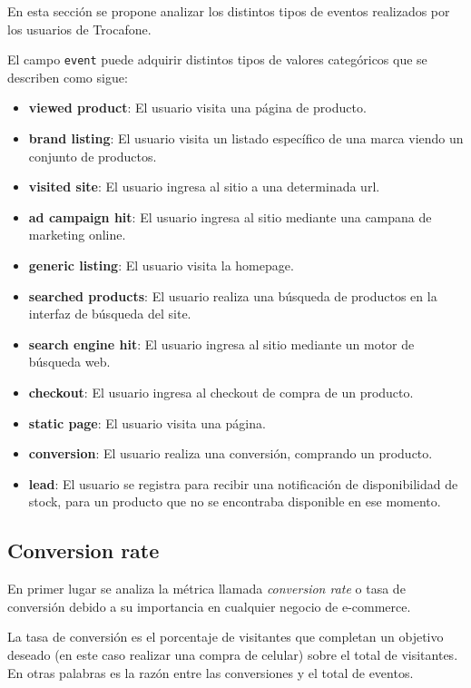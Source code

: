 \documentclass[a4paper]{article}
\begin{document}
En esta sección se propone analizar los distintos tipos de eventos realizados por los usuarios de Trocafone. 

El campo \texttt{event} puede adquirir distintos tipos de valores categóricos que se describen como sigue:

\begin{itemize}
	\item \textbf{viewed product}: El usuario visita una página de producto.
	\item \textbf{brand listing}: El usuario visita un listado específico de una marca viendo un conjunto de productos.
	\item \textbf{visited site}:  El usuario ingresa al sitio a una determinada url.
	\item \textbf{ad campaign hit}: El usuario ingresa al sitio mediante una campana de marketing online.
	\item \textbf{generic listing}: El usuario visita la homepage.
	\item \textbf{searched products}: El usuario realiza una búsqueda de productos en la interfaz de búsqueda del site.
	\item \textbf{search engine hit}: El usuario ingresa al sitio mediante un motor de búsqueda web.
	\item \textbf{checkout}: El usuario ingresa al checkout de compra de un producto.
	\item \textbf{static page}:  El usuario visita una página.
	\item \textbf{conversion}: El usuario realiza una conversión, comprando un producto.
	\item \textbf{lead}: El usuario se registra para recibir una notificación de disponibilidad de stock, para un producto que no se encontraba disponible en ese momento.					
\end{itemize}

\subsection{Conversion rate}

En primer lugar se analiza la métrica llamada \textit{conversion rate} o tasa de conversión debido a su importancia en cualquier negocio de e-commerce.

La tasa de conversión es el porcentaje de visitantes que completan un objetivo deseado (en este caso realizar una compra de celular) sobre el total de visitantes. En otras palabras es la razón entre las conversiones y el total de eventos.
\end{document}
